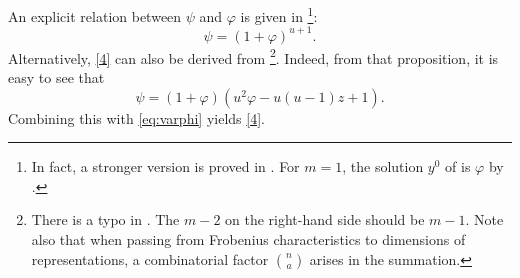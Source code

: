 \documentclass[11pt,letterpaper]{amsart}
\numberwithin{equation}{section}
\theoremstyle{definition}
\def\beq{\begin{equation}}
\def\eeq{\end{equation}}
\begin{document}
An explicit relation between $\psi$ and $\varphi$ is given in \cite[IV. (4.24)]{Manin}\footnote{In fact, a stronger version is proved in \cite{Manin}. For $m=1$, the solution $y^0$ of \cite[IV. (4.22)]{Manin} is $\varphi$ by \cite[IV. (4.7)]{Manin}. %
}:
\beq\label{4} \psi=(1+\varphi)^{u+1}.\eeq
Alternatively, \eqref{4} can also be derived from \cite[Proposition 6.8]{CKL1}\footnote{There is a typo in \cite[Proposition 6.8]{CKL1}. The $m-2$ on the right-hand side should be $m-1$. Note also that when passing from Frobenius characteristics to dimensions of representations, a combinatorial factor $\binom{n}{a}$ arises in the summation.}. Indeed, from that proposition, it is easy to see that
\beq\label{3}
\psi= (1+\varphi)(u^2 \varphi -u(u-1)z +1).
\eeq
Combining this with \eqref{eq:varphi} yields \eqref{4}.
\end{document}
